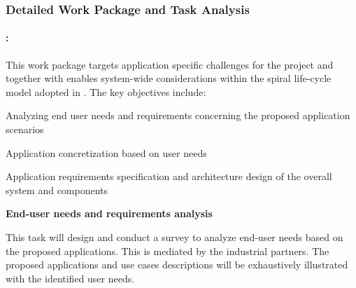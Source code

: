 

\subsubsection{Detailed Work Package and Task Analysis}
\label{sec:workpackages}


\paragraph{\WPSpecification: \WPSpecificationTitle \\}

{\noindent\wptablefont
\label{wp1}

\wptableheaderB{\WPSpecificationVW}{\WPSpecificationETHZ}{\WPSpecificationIBM}{\WPSpecificationCLUJ}{\WPSpecificationPRAGUE}


This work package targets application specific challenges for the project and together with \WPIntegration \space enables system-wide considerations within the spiral life-cycle model adopted in \Project. The key objectives include:
\begin{denseItemize}
\item Analyzing end user needs and requirements concerning the proposed application scenarios
\item Application concretization based on user needs
\item Application requirements specification and architecture design of the overall system and components
\end{denseItemize}

\begin{tasks}{\WPSpecificationNo}
\item  {\bf End-user needs and requirements analysis}
  \taskpartners{\CLUJ}{\IBM, \VW}
     \label{task:wpspec:enduser}

This task will design and conduct a survey to analyze end-user needs based on the proposed applications. This is mediated by the industrial partners. The proposed applications and use cases descriptions will be exhaustively illustrated with the identified user needs.



\end{tasks}}
